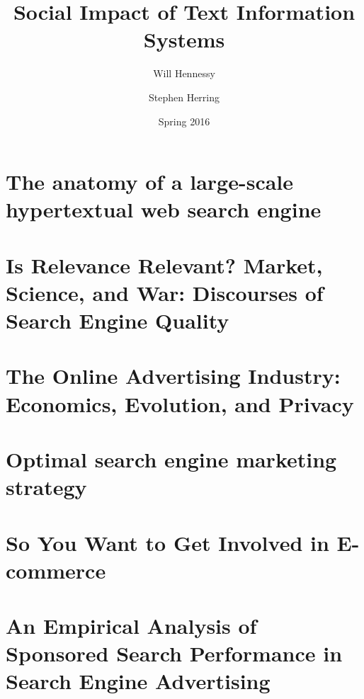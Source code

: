 \documentclass[11pt]{article}
\title{Social Impact of Text Information Systems}
\author{Will Hennessy \and Stephen Herring}
\date{Spring 2016}
\begin{document}
\maketitle


\newpage

\section{The anatomy of a large-scale hypertextual web search engine}

\newpage

\section{Is Relevance Relevant? Market, Science, and War:  Discourses of Search Engine Quality}

\newpage

%

\section{The Online Advertising Industry: Economics, Evolution, and Privacy}

\newpage

\section{Optimal search engine marketing strategy}

\newpage

\section{So You Want to Get Involved in E-commerce}

\newpage

%

\section{An Empirical Analysis of Sponsored Search Performance in Search Engine Advertising}

\newpage

%

%
\end{document}
